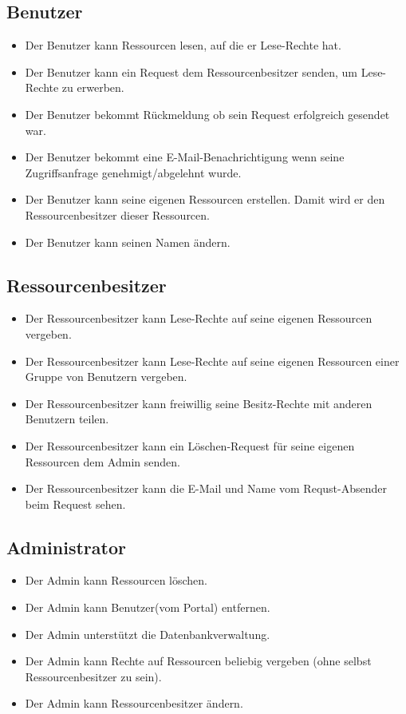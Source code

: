 \documentclass[parskip=full,11pt]{scrartcl}
\begin{document}
\subsection*{Benutzer}
\begin{itemize}[itemsep=0pt]
\item Der Benutzer kann Ressourcen lesen, auf die er Lese-Rechte hat.
\item Der Benutzer kann ein Request dem Ressourcenbesitzer senden, um Lese-Rechte zu erwerben.
\item Der Benutzer bekommt Rückmeldung ob sein Request erfolgreich gesendet war.
\item Der Benutzer bekommt eine E-Mail-Benachrichtigung wenn seine Zugriffsanfrage genehmigt/abgelehnt wurde.
\item Der Benutzer kann seine eigenen Ressourcen erstellen. Damit wird er den Ressourcenbesitzer dieser Ressourcen.
\item Der Benutzer kann seinen Namen ändern.
\end{itemize}
 
\subsection*{Ressourcenbesitzer}
\begin{itemize}[itemsep=0pt]
\item Der Ressourcenbesitzer kann Lese-Rechte auf seine eigenen Ressourcen vergeben.
\item Der Ressourcenbesitzer kann Lese-Rechte auf seine eigenen Ressourcen einer Gruppe von Benutzern vergeben. %
\item Der Ressourcenbesitzer kann freiwillig seine Besitz-Rechte mit anderen Benutzern teilen.
\item Der Ressourcenbesitzer kann ein \gls{Löschen-Request} für seine eigenen Ressourcen dem Admin senden.
\item Der Ressourcenbesitzer kann die E-Mail und Name vom Requst-Absender beim Request sehen.

\end{itemize}

\subsection*{Administrator}
\begin{itemize}[itemsep=0pt]
\item Der Admin kann Ressourcen löschen.
\item Der Admin kann Benutzer(vom Portal) entfernen.
\item Der Admin unterstützt die Datenbankverwaltung.
\item Der Admin kann Rechte auf Ressourcen beliebig vergeben (ohne selbst Ressourcenbesitzer zu sein).
\item Der Admin kann Ressourcenbesitzer ändern. 
\end{itemize}
\end{document}
